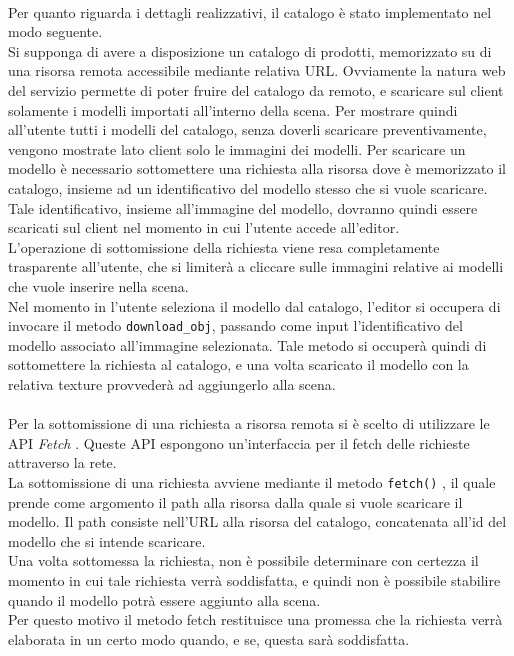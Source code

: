 \\
Per quanto riguarda i dettagli realizzativi, il catalogo è stato implementato nel modo seguente.
\\
Si supponga di avere a disposizione un catalogo di prodotti, memorizzato su di una risorsa remota accessibile mediante relativa URL. Ovviamente la natura web del servizio permette di poter fruire del catalogo da remoto, e scaricare sul client solamente i modelli importati all’interno della scena. Per mostrare quindi all’utente tutti i modelli del catalogo, senza doverli scaricare preventivamente, vengono mostrate lato client solo le immagini dei modelli.
Per scaricare un modello è necessario sottomettere una richiesta alla risorsa dove è memorizzato il catalogo, insieme ad un identificativo del modello stesso che si vuole scaricare. Tale identificativo, insieme all’immagine del modello, dovranno quindi essere scaricati sul client nel momento in cui l’utente accede all’editor.
\\
L’operazione di sottomissione della richiesta viene resa completamente trasparente all’utente, che si limiterà a cliccare sulle immagini relative ai modelli che vuole inserire nella scena.
\\ 
Nel momento in l’utente seleziona il modello dal catalogo, l’editor si occupera di invocare il metodo \texttt{download\_obj}, passando come input l’identificativo del modello associato all’immagine selezionata. Tale metodo si occuperà quindi di sottomettere la richiesta al catalogo, e una volta scaricato il modello con la relativa texture provvederà ad aggiungerlo alla scena. 
\\
\\
Per la sottomissione di una richiesta a risorsa remota si è scelto di utilizzare le API \emph{Fetch} \cite{fetchapi} . Queste API espongono un’interfaccia per il fetch delle richieste attraverso la rete.
\\ 
La sottomissione di una richiesta avviene mediante il metodo \texttt{fetch()} , il quale prende come argomento il path alla risorsa dalla quale si vuole scaricare il modello. Il path consiste nell’URL alla risorsa del catalogo, concatenata all’id del modello che si intende scaricare.
\\
Una volta sottomessa la richiesta, non è possibile determinare con certezza il momento in cui tale richiesta verrà soddisfatta, e quindi non è possibile stabilire quando il modello potrà essere aggiunto alla scena.
\\
Per questo motivo il metodo fetch restituisce una promessa che la richiesta verrà elaborata in un certo modo quando, e se, questa sarà soddisfatta.
